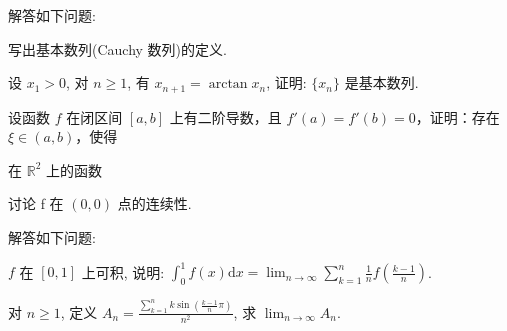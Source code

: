 \par{}
解答如下问题:\par
写出基本数列(Cauchy 数列)的定义.\par
设 $x_{1} > 0$, 对 $n \geq 1$, 有 $x_{n+1} = \arctan x_{n}$, 证明: $\{x_{n}\}$ 是基本数列.\par
\par{}
\par{}
设函数 $f$ 在闭区间 $[a, b]$ 上有二阶导数，且 $f'(a) = f'(b) = 0$，证明：存在 $\xi \in (a, b)$，使得\par
\nopagebreak[4]
\par{}
\par{}
在 $\mathbb{R}^2$ 上的函数\par
\nopagebreak[4]
讨论 f 在  $(0,0)$  点的连续性.\par
\par{}
解答如下问题:\par
$f$ 在 $[0,1]$ 上可积, 说明: $\int_0^1 f(x)\mathrm{d}x = \lim_{n\to \infty}\sum_{k = 1}^{n}\frac{1}{n} f\left(\frac{k - 1}{n}\right)$.\par
对 $n \geq 1$, 定义 $A_{n} = \frac{\sum_{k=1}^{n} k \sin\left(\frac{k-1}{n}\pi\right)}{n^{2}}$, 求 $\lim_{n \to \infty} A_{n}$.\par
